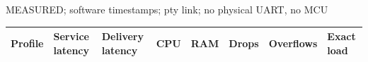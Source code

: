 \par\noindent MEASURED; software timestamps; pty link; no physical UART, no MCU\par
\begin{tabular}{llllllll}
\toprule
Profile & Service latency & Delivery latency & CPU & RAM & Drops & Overflows & Exact load \\
\midrule
\bottomrule
\end{tabular}
